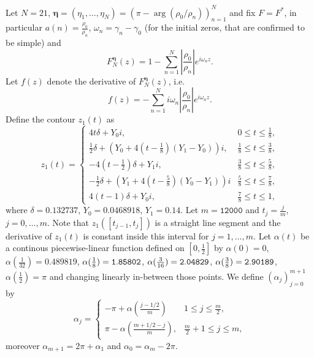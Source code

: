 \documentclass[oneside,english]{amsart}
\numberwithin{equation}{section}
\numberwithin{figure}{section}
\theoremstyle{plain}
\theoremstyle{plain}
\theoremstyle{plain}
\theoremstyle{definition}
\begin{document}
Let $N=21$, $\boldsymbol{\eta}=(\eta_{1},\dotsc,\eta_{N})=\left(\pi-\arg\left(\rho_{0}/\rho_{n}\right)\right)_{n=1}^{N}$
and fix $F=F^{*}$, in particular $a(n)=\frac{\rho_{0}}{\rho_{n}}$,
$\omega_{n}=\gamma_{n}-\gamma_{0}$ (for the initial zeros, that are
confirmed to be simple) and
\[
F_{N}^{\boldsymbol{\eta}}(z)=1-\sum_{n=1}^{N}\left|\frac{\rho_{0}}{\rho_{n}}\right|e^{i\omega_{n}z}.
\]
Let $f(z)$ denote the derivative of $F_{N}^{\boldsymbol{\eta}}(z)$,
i.e.
\[
f(z)=-\sum_{n=1}^{N}i\omega_{n}\left|\frac{\rho_{0}}{\rho_{n}}\right|e^{i\omega_{n}z}.
\]
Define the contour $z_{1}(t)$ as
\[
z_{1}(t)=\begin{cases}
4t\delta+Y_{0}i, & 0\leq t\leq\tfrac{1}{8},\\
\tfrac{1}{2}\delta+\left(Y_{0}+4(t-\tfrac{1}{8})(Y_{1}-Y_{0})\right)i, & \tfrac{1}{8}\leq t\leq\tfrac{3}{8},\\
-4(t-\tfrac{1}{2})\delta+Y_{1}i, & \tfrac{3}{8}\leq t\leq\tfrac{5}{8},\\
-\tfrac{1}{2}\delta+\left(Y_{1}+4(t-\tfrac{5}{8})(Y_{0}-Y_{1})\right)i & \tfrac{5}{8}\leq t\leq\tfrac{7}{8},\\
4(t-1)\delta+Y_{0}i, & \tfrac{7}{8}\leq t\leq1,
\end{cases}
\]
where $\delta=\mathtt{0.132737}$, $Y_{0}=\mathtt{0.0468918}$, $Y_{1}=\mathtt{0.14}$.
Let $m=\mathtt{12000}$ and $t_{j}=\frac{j}{m}$, $j=0,\dotsc,m$.
Note that $z_{1}([t_{j-1},t_{j}])$ is a straight line segment and
the derivative of $z_{1}(t)$ is constant inside this interval for
$j=1,\dotsc,m$. Let $\alpha(t)$ be a continous piecewise-linear
function defined on $[0,\frac{1}{2}]$ by $\alpha(0)=0$, $\alpha(\frac{1}{32})=\mathtt{0.489819}$,
$\alpha(\frac{1}{8})={\tt 1.85802}$, $\alpha(\frac{3}{16})={\tt 2.04829}$,
$\alpha(\frac{3}{8})={\tt 2.90189}$, $\alpha(\frac{1}{2})=\pi$ and
changing linearly in-between those points. We define $\left(\alpha_{j}\right)_{j=0}^{m+1}$
by
\[
\alpha_{j}=\begin{cases}
-\pi+\alpha\left(\frac{j-1/2}{m}\right) & 1\leq j\leq\frac{m}{2},\\
\pi-\alpha\left(\frac{m+1/2-j}{m}\right), & \frac{m}{2}+1\leq j\leq m,
\end{cases}
\]
moreover $\alpha_{m+1}=2\pi+\alpha_{1}$ and $\alpha_{0}=\alpha_{m}-2\pi$.
\end{document}
